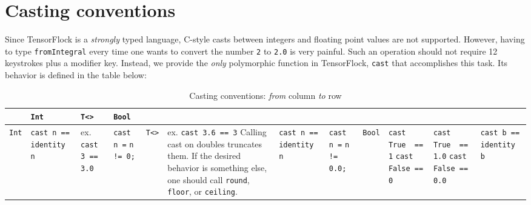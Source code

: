 \section{Casting conventions}%
\label{sec:casting_conventions}

Since TensorFlock is a \emph{strongly} typed language, C-style casts between
integers and floating point values are not supported. However, having to type
\verb|fromIntegral| every time one wants to convert the number \verb|2| to
\verb|2.0| is very painful. Such an operation should not require 12 keystrokes
plus a modifier key. Instead, we provide the \emph{only} polymorphic function
in TensorFlock, \verb|cast| that accomplishes this task. Its behavior is
defined in the table below:

\begin{table}[h]
    \centering
    \caption{Casting conventions: \emph{from} column \emph{to} row}
    \label{tab:label}
    \begin{tabular}{|p{.9cm}||p{5.5cm}|p{5cm}|p{4.5cm}|}
        \hline
        & \verb|Int| & \verb|T<>| & \verb|Bool| \\
        \hline
        \verb|Int| & \verb|cast n == identity n|& ex. \verb|cast 3 == 3.0| & 
        \verb|cast n =| \verb|n != 0;| & 
        \hline
        \verb|T<>| & ex. \verb|cast 3.6 == 3|
                   \newline Calling cast on doubles truncates them. If the
                   desired behavior is something else, one should call \verb|round|,
                   \verb|floor|, or \verb|ceiling|.  
                   & \verb|cast n == identity n| &
                   \verb|cast n =| \verb|n != 0.0;|&
        \hline
        \verb|Bool| & \verb|cast True  == 1| \newline \verb|cast False == 0| &
                      \verb|cast True  == 1.0| \newline \verb|cast False == 0.0| &
                      \verb|cast b ==| \verb|identity b| \\
        \hline
    \end{tabular}
\end{table}
